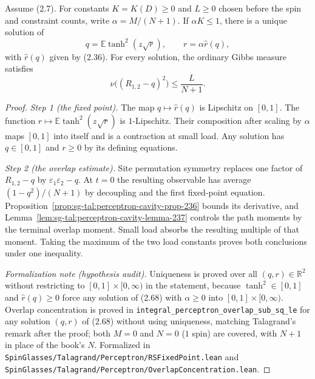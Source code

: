 \begin{theorem}[Theorem 2.4.1]\label{thm:sg-tal:perceptron-rs-fixed-point}
  \leanok
Assume (2.7). For constants $K=K(D)\ge 0$ and $L\ge 0$ chosen before the spin and
constraint counts, write $\alpha=M/(N+1)$. If $\alpha K\le 1$, there is a unique solution of
\[
 q=\mathbb E\tanh^2(z\sqrt r),\qquad r=\alpha\widehat r(q),
\]
with $\widehat r(q)$ given by (2.36). For every solution, the ordinary Gibbs measure satisfies
\[
 \nu\bigl((R_{1,2}-q)^2\bigr)\le \frac{L}{N+1}.
\]
\end{theorem}
\begin{proof}
  \leanok
\emph{Step 1 (the fixed point).} The map $q\mapsto\widehat r(q)$ is Lipschitz on $[0,1]$.
The function $r\mapsto\mathbb E\tanh^2(z\sqrt r)$ is $1$-Lipschitz. Their composition
after scaling by $\alpha$ maps $[0,1]$ into itself and is a contraction at small load.
Any solution has $q\in[0,1]$ and $r\ge 0$ by its defining equations.

\emph{Step 2 (the overlap estimate).} Site permutation symmetry replaces one factor of
$R_{1,2}-q$ by $\varepsilon_1\varepsilon_2-q$. At $t=0$ the resulting observable has
average $(1-q^2)/(N+1)$ by decoupling and the first fixed-point equation.
Proposition~\ref{prop:sg-tal:perceptron-cavity-prop-236} bounds its derivative, and
Lemma~\ref{lem:sg-tal:perceptron-cavity-lemma-237} controls the path moments by the
terminal overlap moment. Small load absorbs the resulting multiple of that moment.
Taking the maximum of the two load constants proves both conclusions under one inequality.

\emph{Formalization note (hypothesis audit).} Uniqueness is proved over all $(q,r)\in\mathbb R^2$
without restricting to $[0,1]\times[0,\infty)$ in the statement, because $\tanh^2\in[0,1]$ and
$\widehat r(q)\ge 0$ force any solution of (2.68) with $\alpha\ge 0$ into $[0,1]\times[0,\infty)$.
Overlap concentration is proved in \texttt{integral\_perceptron\_overlap\_sub\_sq\_le} for any
solution $(q,r)$ of (2.68) without using uniqueness, matching Talagrand's remark after the proof;
both $M=0$ and $N=0$ ($1$ spin) are covered, with $N+1$ in place of the book's $N$.
Formalized in \texttt{SpinGlasses/Talagrand/Perceptron/RSFixedPoint.lean} and
\texttt{SpinGlasses/Talagrand/Perceptron/OverlapConcentration.lean}.
\end{proof}

